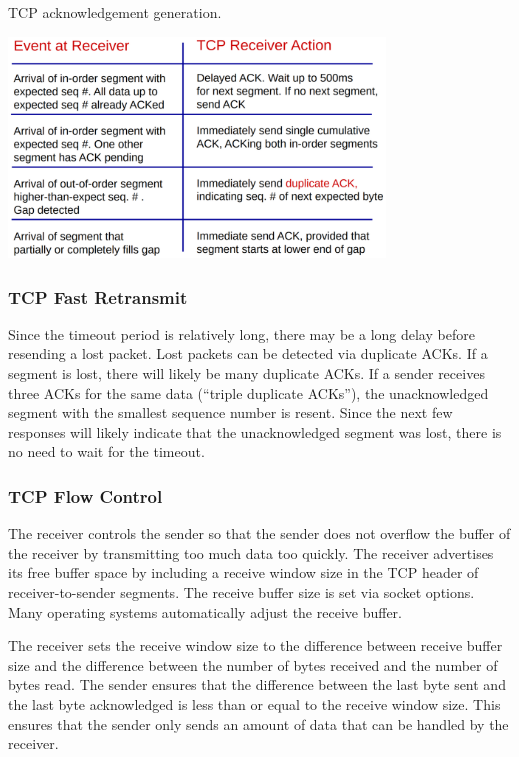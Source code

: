\begin{table}[htp]
  \centering
  \caption*{TCP acknowledgement generation.}
  \includegraphics[width=10cm]{unit-18/figures/acknowledgement-generation.png}
\end{table}

\subsubsection{TCP Fast Retransmit}

Since the timeout period is relatively long, there may be a long delay before resending a lost packet.
Lost packets can be detected via duplicate ACKs.
If a segment is lost, there will likely be many duplicate ACKs.
If a sender receives three ACKs for the same data (``triple duplicate ACKs''), the unacknowledged segment with the smallest sequence number is resent.
Since the next few responses will likely indicate that the unacknowledged segment was lost, there is no need to wait for the timeout.

\subsubsection{TCP Flow Control}

The receiver controls the sender so that the sender does not overflow the buffer of the receiver by transmitting too much data too quickly.
The receiver advertises its free buffer space by including a receive window size in the TCP header of receiver-to-sender segments.
The receive buffer size is set via socket options.
Many operating systems automatically adjust the receive buffer.

The receiver sets the receive window size to the difference between receive buffer size and the difference between the number of bytes received and the number of bytes read.
The sender ensures that the difference between the last byte sent and the last byte acknowledged is less than or equal to the receive window size.
This ensures that the sender only sends an amount of data that can be handled by the receiver.

